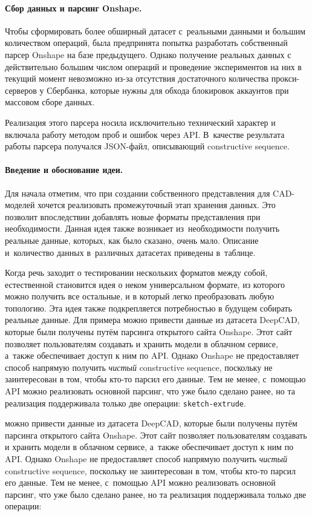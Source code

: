 \paragraph{Сбор данных и парсинг Onshape.}
Чтобы сформировать более обширный датасет с~реальными данными и большим
количеством операций, была предпринята попытка разработать собственный парсер
Onshape на базе предыдущего. Однако получение реальных данных с действительно
большим числом операций и проведение экспериментов на них в текущий момент
невозможно из-за отсутствия достаточного количества прокси-серверов у Сбербанка,
которые нужны для обхода блокировок аккаунтов при массовом сборе данных.

Реализация этого парсера носила исключительно технический характер и включала
работу методом проб и ошибок через API. В~качестве результата работы парсера
получался JSON-файл, описывающий constructive sequence.


\paragraph{Введение и обоснование идеи.}
Для начала отметим, что при создании собственного представления для CAD-моделей
хочется реализовать промежуточный этап хранения данных. Это позволит впоследствии
добавлять новые форматы представления при необходимости. Данная идея также
возникает из~необходимости получить реальные данные, которых, как было сказано,
очень мало. Описание и~количество данных в~различных датасетах приведены в~таблице.

Когда речь заходит о тестировании нескольких форматов между собой, естественной
становится идея о неком универсальном формате, из которого можно получить все
остальные, и в который легко преобразовать любую топологию. Эта идея также
подкрепляется потребностью в будущем собирать реальные данные. Для примера
можно привести данные из датасета DeepCAD, которые были получены путём парсинга
открытого сайта Onshape. Этот сайт позволяет пользователям создавать и хранить
модели в облачном сервисе, а~также обеспечивает доступ к ним по API. Однако
Onshape не предоставляет способ напрямую получить \emph{чистый} constructive
sequence, поскольку не заинтересован в том, чтобы кто-то парсил его данные.
Тем не менее, с~помощью API можно реализовать основной парсинг, что уже было
сделано ранее, но та реализация поддерживала только две операции:
\texttt{sketch-extrude}.

можно привести данные из датасета DeepCAD, которые были получены путём парсинга
открытого сайта Onshape. Этот сайт позволяет пользователям создавать и хранить
модели в облачном сервисе, а~также обеспечивает доступ к ним по API. Однако
Onshape не предоставляет способ напрямую получить \emph{чистый} constructive
sequence, поскольку не заинтересован в том, чтобы кто-то парсил его данные.
Тем не менее, с~помощью API можно реализовать основной парсинг, что уже было
сделано ранее, но та реализация поддерживала только две операции: